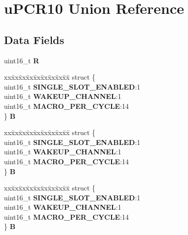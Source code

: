 \hypertarget{unionuPCR10}{}\section{u\+P\+C\+R10 Union Reference}
\label{unionuPCR10}
\subsection*{Data Fields}
\begin{DoxyCompactItemize}
\item 
\mbox{\label{unionuPCR10_af48019780df5331fa199f34682533ab7}} 
uint16\+\_\+t {\bfseries R}
\item 
\mbox{\label{unionuPCR10_a8166d6149981cac2ef37cf7bbbb1e7d5}} 
\begin{tabbing}
xx\=xx\=xx\=xx\=xx\=xx\=xx\=xx\=xx\=\kill
struct \{\\
\>uint16\_t {\bfseries SINGLE\_SLOT\_ENABLED}:1\\
\>uint16\_t {\bfseries WAKEUP\_CHANNEL}:1\\
\>uint16\_t {\bfseries MACRO\_PER\_CYCLE}:14\\
\} {\bfseries B}\\

\end{tabbing}\item 
\mbox{\label{unionuPCR10_ab0d9b3a4cbb7751ba43b20199de54a9d}} 
\begin{tabbing}
xx\=xx\=xx\=xx\=xx\=xx\=xx\=xx\=xx\=\kill
struct \{\\
\>uint16\_t {\bfseries SINGLE\_SLOT\_ENABLED}:1\\
\>uint16\_t {\bfseries WAKEUP\_CHANNEL}:1\\
\>uint16\_t {\bfseries MACRO\_PER\_CYCLE}:14\\
\} {\bfseries B}\\

\end{tabbing}\item 
\mbox{\label{unionuPCR10_ab826f35835fa209221188e2083469b84}} 
\begin{tabbing}
xx\=xx\=xx\=xx\=xx\=xx\=xx\=xx\=xx\=\kill
struct \{\\
\>uint16\_t {\bfseries SINGLE\_SLOT\_ENABLED}:1\\
\>uint16\_t {\bfseries WAKEUP\_CHANNEL}:1\\
\>uint16\_t {\bfseries MACRO\_PER\_CYCLE}:14\\
\} {\bfseries B}\\


\end{tabbing}
\end{DoxyCompactItemize}
